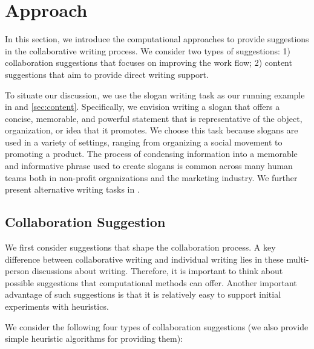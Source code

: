 
\section{Approach}


In this section, we introduce the computational approaches to provide suggestions in the collaborative writing process.
We consider two types of suggestions: 1) collaboration suggestions that focuses on improving the work flow;
2) content suggestions that aim to provide direct writing support.

To situate our discussion, we use the slogan writing task as our running example in  and \ref{sec:content}.
Specifically, we envision writing a slogan that offers a concise, memorable,
and powerful statement that is representative of the object,
organization, or idea that it promotes.
We choose this task because slogans are used in a variety of settings, ranging
from organizing a social movement to promoting a product.
The process of condensing information into a memorable and
informative phrase used to create slogans is common across many human teams both in non-profit organizations and the marketing industry.
We further present alternative writing tasks in .


\subsection{Collaboration Suggestion}
\label{sec:workflow}

We first consider suggestions that shape the collaboration process.
A key difference between collaborative writing and individual writing lies in these multi-person discussions about writing.
Therefore, it is important to think about possible suggestions that computational methods can offer.
Another important advantage of such suggestions is that it is relatively easy to support initial experiments with heuristics. 


We consider the following four types of collaboration suggestions (we also provide simple heuristic algorithms for providing them):

